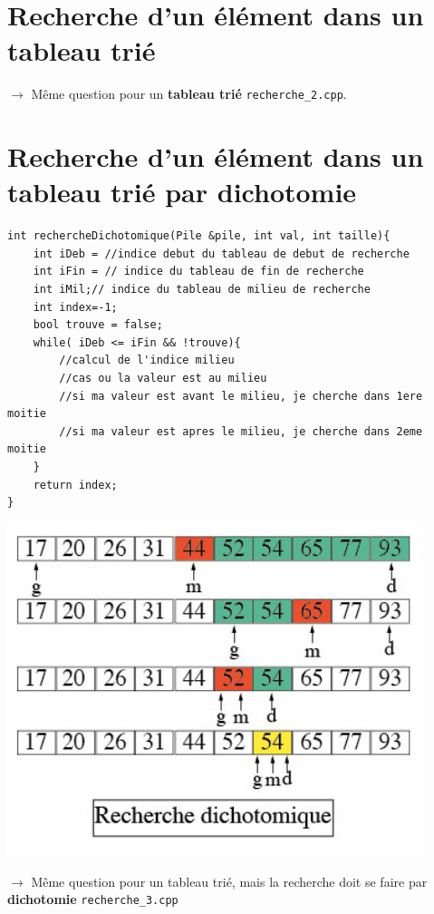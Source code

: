 \documentclass[french]{article}
\begin{document}
\section{Recherche d'un élément dans un tableau trié}
	$\rightarrow$ Même question pour un \textbf{tableau trié} \texttt{recherche\_2.cpp}.
	\section{Recherche d'un élément dans un tableau trié par dichotomie}
	
	\noindent\begin{minipage}{.65\textwidth}
	\begin{lstlisting}[caption={Recherche dichotomique dans un tableau trie}]
int rechercheDichotomique(Pile &pile, int val, int taille){
    int iDeb = //indice debut du tableau de debut de recherche
    int iFin = // indice du tableau de fin de recherche
    int iMil;// indice du tableau de milieu de recherche
    int index=-1;
    bool trouve = false;
    while( iDeb <= iFin && !trouve){
        //calcul de l'indice milieu
        //cas ou la valeur est au milieu
        //si ma valeur est avant le milieu, je cherche dans 1ere moitie
        //si ma valeur est apres le milieu, je cherche dans 2eme moitie
    }
    return index;
}
	\end{lstlisting}
\end{minipage}
\begin{minipage}{.45\textwidth}

		\includegraphics[width=0.9\textwidth]{dicho.jpg}

\end{minipage}\hfill
	$\rightarrow$ Même question pour un tableau trié, mais la recherche doit se faire par \textbf{dichotomie} \texttt{recherche\_3.cpp}
\end{document}
